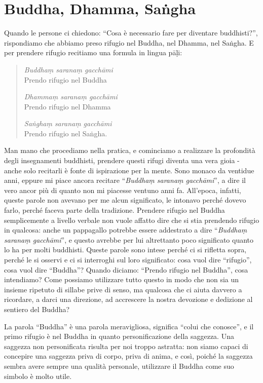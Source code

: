 \chapter{Buddha, Dhamma, Saṅgha}

Quando le persone ci chiedono: ``Cosa è necessario fare per diventare
buddhisti?'', rispondiamo che abbiamo preso rifugio nel Buddha, nel
Dhamma, nel Saṅgha. E per prendere rifugio recitiamo una formula in
lingua pāḷi:

\begin{quote}
\emph{Buddhaṃ saranaṃ gacchāmi}\\
Prendo rifugio nel Buddha

\bigskip

\emph{Dhammaṃ saranaṃ gacchāmi}\\
Prendo rifugio nel Dhamma

\bigskip

\emph{Saṅghaṃ saranaṃ gacchāmi}\\
Prendo rifugio nel Saṅgha.
\end{quote}

Man mano che procediamo nella pratica, e cominciamo a realizzare la
profondità degli insegnamenti buddhisti, prendere questi rifugi diventa
una vera gioia - anche solo recitarli è fonte di ispirazione per la
mente. Sono monaco da ventidue anni, eppure mi piace ancora recitare
``\emph{Buddhaṃ saranaṃ gacchāmi}'', a dire il vero ancor più di quanto
non mi piacesse ventuno anni fa. All'epoca, infatti, queste parole non
avevano per me alcun significato, le intonavo perché dovevo farlo,
perché faceva parte della tradizione. Prendere rifugio nel Buddha
semplicemente a livello verbale non vuole affatto dire che si stia
prendendo rifugio in qualcosa: anche un pappagallo potrebbe essere
addestrato a dire ``\emph{Buddhaṃ saranaṃ gacchāmi}'', e questo avrebbe
per lui altrettanto poco significato quanto lo ha per molti buddhisti.
Queste parole sono intese perché ci si rifletta sopra, perché le si
osservi e ci si interroghi sul loro significato: cosa vuol dire
``rifugio'', cosa vuol dire ``Buddha''? Quando diciamo: ``Prendo rifugio
nel Buddha'', cosa intendiamo? Come possiamo utilizzare tutto questo in
modo che non sia un insieme ripetuto di sillabe prive di senso, ma
qualcosa che ci aiuta davvero a ricordare, a darci una direzione, ad
accrescere la nostra devozione e dedizione al sentiero del Buddha?

La parola ``Buddha'' è una parola meravigliosa, significa ``colui che
conosce'', e il primo rifugio è nel Buddha in quanto personificazione
della saggezza. Una saggezza non personificata risulta per noi troppo
astratta: non siamo capaci di concepire una saggezza priva di corpo,
priva di anima, e così, poiché la saggezza sembra avere sempre una
qualità personale, utilizzare il Buddha come suo simbolo è molto utile.

